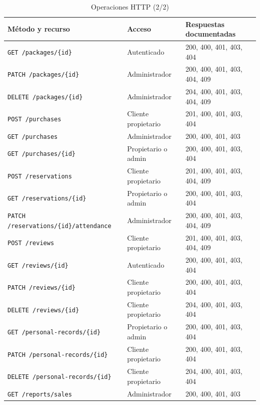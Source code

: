 \begin{table}[!t]\caption{Operaciones HTTP (2/2)}\label{tab:operaciones-laura-2}\centering\footnotesize
\begin{tabular}{p{}p{}p{}}\toprule
Método y recurso & Acceso & Respuestas documentadas \\ \midrule
\texttt{GET /\allowbreak{}packages/\allowbreak{}\{id\}} & Autenticado & 200, 400, 401, 403, 404 \\
\texttt{PATCH /\allowbreak{}packages/\allowbreak{}\{id\}} & Administrador & 200, 400, 401, 403, 404, 409 \\
\texttt{DELETE /\allowbreak{}packages/\allowbreak{}\{id\}} & Administrador & 204, 400, 401, 403, 404, 409 \\
\texttt{POST /\allowbreak{}purchases} & Cliente propietario & 201, 400, 401, 403, 404 \\
\texttt{GET /\allowbreak{}purchases} & Administrador & 200, 400, 401, 403 \\
\texttt{GET /\allowbreak{}purchases/\allowbreak{}\{id\}} & Propietario o admin & 200, 400, 401, 403, 404 \\
\texttt{POST /\allowbreak{}reservations} & Cliente propietario & 201, 400, 401, 403, 404, 409 \\
\texttt{GET /\allowbreak{}reservations/\allowbreak{}\{id\}} & Propietario o admin & 200, 400, 401, 403, 404 \\
\texttt{PATCH /\allowbreak{}reservations/\allowbreak{}\{id\}/\allowbreak{}attendance} & Administrador & 200, 400, 401, 403, 404, 409 \\
\texttt{POST /\allowbreak{}reviews} & Cliente propietario & 201, 400, 401, 403, 404, 409 \\
\texttt{GET /\allowbreak{}reviews/\allowbreak{}\{id\}} & Autenticado & 200, 400, 401, 403, 404 \\
\texttt{PATCH /\allowbreak{}reviews/\allowbreak{}\{id\}} & Cliente propietario & 200, 400, 401, 403, 404 \\
\texttt{DELETE /\allowbreak{}reviews/\allowbreak{}\{id\}} & Cliente propietario & 204, 400, 401, 403, 404 \\
\texttt{GET /\allowbreak{}personal-records/\allowbreak{}\{id\}} & Propietario o admin & 200, 400, 401, 403, 404 \\
\texttt{PATCH /\allowbreak{}personal-records/\allowbreak{}\{id\}} & Cliente propietario & 200, 400, 401, 403, 404 \\
\texttt{DELETE /\allowbreak{}personal-records/\allowbreak{}\{id\}} & Cliente propietario & 204, 400, 401, 403, 404 \\
\texttt{GET /\allowbreak{}reports/\allowbreak{}sales} & Administrador & 200, 400, 401, 403 \\
\bottomrule\end{tabular}\end{table}
